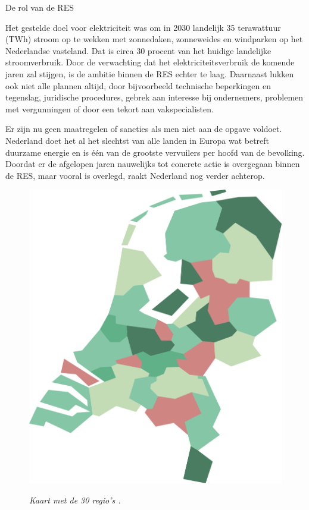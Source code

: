 \begin{voorstel}{De rol van de RES}
\begin{multicols*}{2}
\begin{overwegingen}
Het gestelde doel voor elektriciteit was om in 2030 landelijk 35 terawattuur (TWh) stroom op te wekken met zonnedaken, zonneweides en windparken op het Nederlandse vasteland. Dat is circa 30 procent van het huidige landelijke stroomverbruik.
Door de verwachting dat het elektriciteitsverbruik de komende jaren zal stijgen, is de ambitie binnen de RES echter te laag.
Daarnaast lukken ook niet alle plannen altijd, door bijvoorbeeld technische beperkingen en tegenslag, juridische procedures, gebrek aan interesse bij ondernemers, problemen met vergunningen of door een tekort aan vakspecialisten.

Er zijn nu geen maatregelen of sancties als men niet aan de opgave voldoet.
Nederland doet het al het slechtst van alle landen in Europa wat betreft duurzame energie en is één van de grootste vervuilers per hoofd van de bevolking. Doordat er de afgelopen jaren nauwelijks tot concrete actie is overgegaan binnen de RES, maar vooral is overlegd, raakt Nederland nog verder achterop.

\begin{figure}[H]
	\begin{center}
		\includegraphics[width=.8\columnwidth]{img/energie/rol-van-de-res-kaart}
	\end{center}
	\textit{Kaart met de 30 regio's \parencite{nationaal_programma_res_handreiking_2019}.}
\end{figure}


\end{overwegingen}
\end{multicols*}
\end{voorstel}
